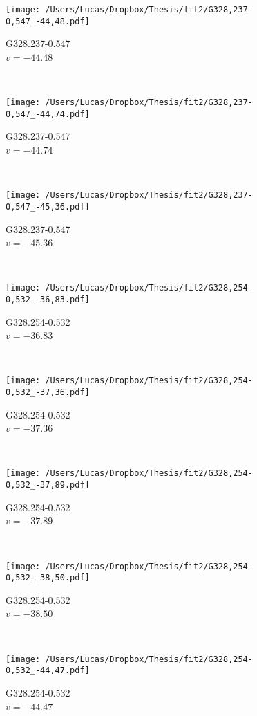 \begin{figure*}[t]\ContinuedFloat
	\centering
	\begin{subfigure}[t]{0.3\textwidth}
		\texttt{[image: /Users/Lucas/Dropbox/Thesis/fit2/G328,237-0,547\_-44,48.pdf]}
		\caption[]{G328.237-0.547\\$v=-44.48$\,\kms}
	\end{subfigure}
	~
	\begin{subfigure}[t]{0.3\textwidth}
		\texttt{[image: /Users/Lucas/Dropbox/Thesis/fit2/G328,237-0,547\_-44,74.pdf]}
		\caption[]{G328.237-0.547\\$v=-44.74$\,\kms}
	\end{subfigure}
	~
	\begin{subfigure}[t]{0.3\textwidth}
		\texttt{[image: /Users/Lucas/Dropbox/Thesis/fit2/G328,237-0,547\_-45,36.pdf]}
		\caption[]{G328.237-0.547\\$v=-45.36$\,\kms}
	\end{subfigure}
	~
	\begin{subfigure}[t]{0.3\textwidth}
		\texttt{[image: /Users/Lucas/Dropbox/Thesis/fit2/G328,254-0,532\_-36,83.pdf]}
		\caption[]{G328.254-0.532\\$v=-36.83$\,\kms}
	\end{subfigure}
	~
	\begin{subfigure}[t]{0.3\textwidth}
		\texttt{[image: /Users/Lucas/Dropbox/Thesis/fit2/G328,254-0,532\_-37,36.pdf]}
		\caption[]{G328.254-0.532\\$v=-37.36$\,\kms}
	\end{subfigure}
	~
	\begin{subfigure}[t]{0.3\textwidth}
		\texttt{[image: /Users/Lucas/Dropbox/Thesis/fit2/G328,254-0,532\_-37,89.pdf]}
		\caption[]{G328.254-0.532\\$v=-37.89$\,\kms}
	\end{subfigure}
	~
	\begin{subfigure}[t]{0.3\textwidth}
		\texttt{[image: /Users/Lucas/Dropbox/Thesis/fit2/G328,254-0,532\_-38,50.pdf]}
		\caption[]{G328.254-0.532\\$v=-38.50$\,\kms}
	\end{subfigure}
	~
	\begin{subfigure}[t]{0.3\textwidth}
		\texttt{[image: /Users/Lucas/Dropbox/Thesis/fit2/G328,254-0,532\_-44,47.pdf]}
		\caption[]{G328.254-0.532\\$v=-44.47$\,\kms}

\end{subfigure}
\end{figure*}
